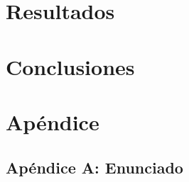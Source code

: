 \documentclass[10pt, a4paper, english, spanish]{article}
\begin{document}
\section{Resultados}

\clearpage

%

\section{Conclusiones}


\section{Apéndice}
\subsection{Apéndice A: Enunciado}\label{enunciado}
  

\end{document}
